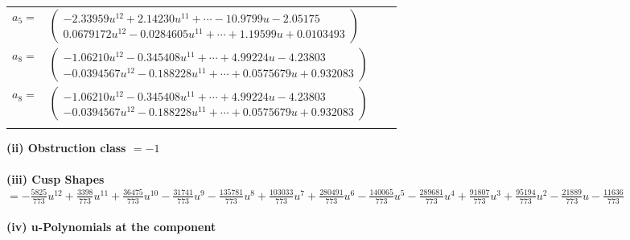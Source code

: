 \documentclass[1p]{elsarticle_modified}
\theoremstyle{definition}
\begin{document}
\begin{tabular}{m{7pt} m{180pt} m{7pt} m{180pt} }
\flushright $a_{5}=$&$\begin{pmatrix}-2.33959 u^{12}+2.14230 u^{11}+\cdots-10.9799 u-2.05175\\0.0679172 u^{12}-0.0284605 u^{11}+\cdots+1.19599 u+0.0103493\end{pmatrix}$ \\
\flushright $a_{8}=$&$\begin{pmatrix}-1.06210 u^{12}-0.345408 u^{11}+\cdots+4.99224 u-4.23803\\-0.0394567 u^{12}-0.188228 u^{11}+\cdots+0.0575679 u+0.932083\end{pmatrix}$\\ \flushright $a_{8}=$&$\begin{pmatrix}-1.06210 u^{12}-0.345408 u^{11}+\cdots+4.99224 u-4.23803\\-0.0394567 u^{12}-0.188228 u^{11}+\cdots+0.0575679 u+0.932083\end{pmatrix}$\\&\end{tabular}
\flushleft \textbf{(ii) Obstruction class $= -1$}\\~\\
\flushleft \textbf{(iii) Cusp Shapes $= -\frac{5825}{773} u^{12}+\frac{3398}{773} u^{11}+\frac{36475}{773} u^{10}-\frac{31741}{773} u^9-\frac{135781}{773} u^8+\frac{103033}{773} u^7+\frac{280491}{773} u^6-\frac{140065}{773} u^5-\frac{289681}{773} u^4+\frac{91807}{773} u^3+\frac{95194}{773} u^2-\frac{21889}{773} u-\frac{11636}{773}$}\\~\\
\newpage\renewcommand{\arraystretch}{1}
\flushleft \textbf{(iv) u-Polynomials at the component}\newline \\
\end{document}
